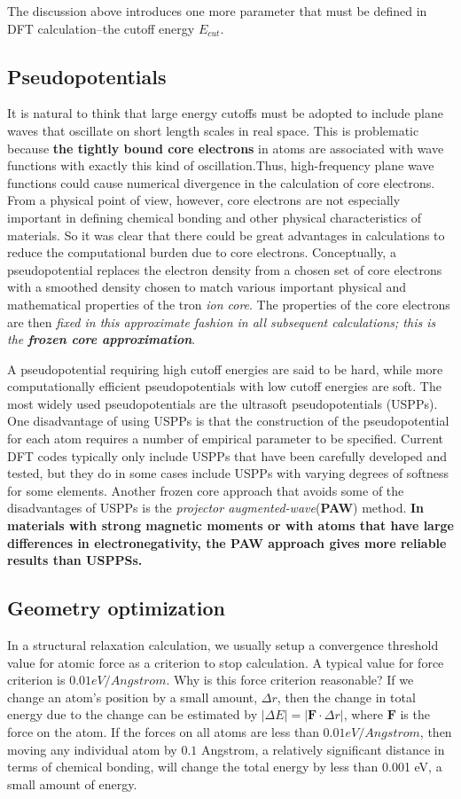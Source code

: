 \documentclass[12pt]{article}
\begin{document}
The discussion above introduces one more parameter that must be defined in DFT calculation--the cutoff energy $E_{cut}$.
\subsection{Pseudopotentials}
It is natural to think that large energy cutoffs must be adopted to include plane waves that oscillate on short length scales in real space. This is problematic because \textbf{the tightly bound core electrons} in atoms are associated with wave functions with exactly this kind of oscillation.Thus, high-frequency plane wave functions could cause numerical divergence in the calculation of core electrons. From a physical point of view, however, core electrons are not especially important in defining chemical bonding and other physical characteristics of materials. So it was clear that there could be great advantages in calculations to reduce the computational burden due to core electrons. Conceptually, a pseudopotential replaces the electron density from a chosen set of core electrons with a smoothed density chosen to match various important physical and mathematical properties of the tron \textit{ion core}. The properties of the core electrons are then \emph{fixed in this approximate fashion in all subsequent calculations; this is the \textbf{frozen core approximation}}.

A pseudopotential requiring high cutoff energies are said to be hard, while more computationally efficient pseudopotentials with low cutoff energies are soft. The most widely used pseudopotentials are the ultrasoft pseudopotentials (USPPs). One disadvantage of using USPPs is that the construction of the pseudopotential for each atom requires a number of empirical parameter to be specified. Current DFT codes typically only include USPPs that have been carefully developed and tested, but they do in some cases include USPPs with varying degrees of softness for some elements. Another frozen core approach that avoids some of the disadvantages of USPPs is the \textit{projector augmented-wave}(\textbf{PAW}) method. \textbf{In materials with strong magnetic moments or with atoms that have large differences in electronegativity, the PAW approach gives more reliable results than USPPSs.}

\subsection{Geometry optimization}
In a structural relaxation calculation, we usually setup a convergence threshold value for atomic force as a criterion to stop calculation. A typical value for force criterion is $0.01 eV/Angstrom$. Why is this force criterion reasonable? If we change an atom's position by a small amount, $\Delta r$, then the change in total energy due to the change can be estimated by $|\Delta E|=|\boldsymbol{F}\cdot \Delta r|$, where $\boldsymbol{F}$ is the force on the atom. If the forces on all atoms are less than $0.01 eV/Angstrom$, then moving any individual atom by $0.1$ Angstrom, a relatively significant distance in terms of chemical bonding, will change the total energy by less than 0.001 eV, a small amount of energy.
\end{document}
